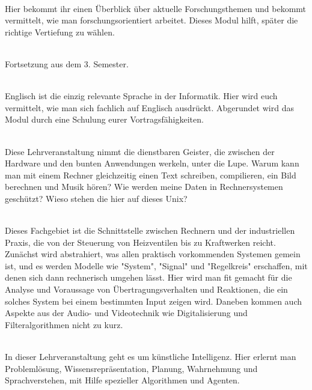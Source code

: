 \textbf{} \\
Hier bekommt ihr einen Überblick über aktuelle Forschungsthemen und bekommt vermittelt, wie man forschungsorientiert arbeitet.
Dieses Modul hilft, später die richtige Vertiefung zu wählen.

\textbf{} \\
Fortsetzung aus dem 3. Semester.

\textbf{} \\
Englisch ist die einzig relevante Sprache in der Informatik.
Hier wird euch vermittelt, wie man sich fachlich auf Englisch ausdrückt.
Abgerundet wird das Modul durch eine Schulung eurer Vortragsfähigkeiten.


\textbf{} \\
Diese Lehrveranstaltung nimmt die dienstbaren Geister, die zwischen der Hardware und den bunten Anwendungen werkeln, unter die Lupe.
Warum kann man mit einem Rechner gleichzeitig einen Text schreiben, compilieren, ein Bild berechnen und Musik hören?
Wie werden meine Daten in Rechnersystemen geschützt?
Wieso stehen die hier auf dieses Unix?

\textbf{} \\
Dieses Fachgebiet ist die Schnittstelle zwischen Rechnern und der industriellen Praxis, die von der Steuerung von Heizventilen bis zu Kraftwerken reicht.
Zunächst wird abstrahiert, was allen praktisch vorkommenden Systemen gemein ist, und es werden Modelle wie "System", "Signal" und "Regelkreis" erschaffen, mit denen sich dann rechnerisch umgehen lässt.
Hier wird man fit gemacht für die Analyse und Voraussage von Übertragungsverhalten und Reaktionen, die ein solches System bei einem bestimmten Input zeigen wird.
Daneben kommen auch Aspekte aus der Audio- und Videotechnik wie Digitalisierung und Filteralgorithmen nicht zu kurz.

\textbf{} \\
In dieser Lehrveranstaltung geht es um künstliche Intelligenz.
Hier erlernt man Problemlösung, Wissensrepräsentation, Planung, Wahrnehmung und Sprachverstehen, mit Hilfe spezieller Algorithmen und Agenten.

